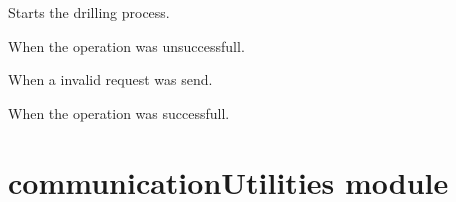 \documentclass[letterpaper,10pt,english]{sphinxmanual}
\begin{document}

\begin{fulllineitems}
\label{commands:commands.REQUEST_STARTDRILLING}
Starts the drilling process.

\end{fulllineitems}


\begin{fulllineitems}
\label{commands:commands.RESPONSE_FAIL}
When the operation was unsuccessfull.

\end{fulllineitems}


\begin{fulllineitems}
\label{commands:commands.RESPONSE_INVALID_REQUEST}
When a invalid request was send.

\end{fulllineitems}


\begin{fulllineitems}
\label{commands:commands.RESPONSE_SUCCESS}
When the operation was successfull.

\end{fulllineitems}



\section{communicationUtilities module}
\label{communicationUtilities:module-communicationUtilities}\label{communicationUtilities:communicationutilities-module}\label{communicationUtilities::doc}
\end{document}
